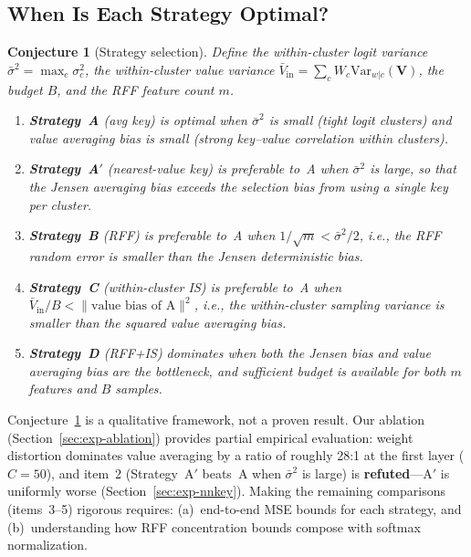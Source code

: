 \documentclass[11pt,a4paper]{article}
\newtheorem{conjecture}[theorem]{Conjecture}
\theoremstyle{definition}
\newcommand{\Var}{\mathrm{Var}}
\begin{document}
\subsection{When Is Each Strategy Optimal?}

\begin{conjecture}[Strategy selection]\label{conj:strategy}
Define the within-cluster logit variance $\bar{\sigma}^2 = \max_c\sigma_c^2$,
the within-cluster value variance
$\bar{V}_{\mathrm{in}} = \sum_c W_c\Var_{w|c}(\mathbf{V})$,
the budget $B$, and the RFF feature count $m$.
\begin{enumerate}[nosep]
  \item \textbf{Strategy~A} (avg key) is optimal when $\bar{\sigma}^2$ is
    small (tight logit clusters) and value averaging bias is small (strong
    key--value correlation within clusters).

  \item \textbf{Strategy~A$'$} (nearest-value key) is preferable to~A when
    $\bar{\sigma}^2$ is large, so that the Jensen averaging bias exceeds the
    selection bias from using a single key per cluster.

  \item \textbf{Strategy~B} (RFF) is preferable to~A when
    $1/\sqrt{m} < \bar{\sigma}^2/2$, i.e., the RFF random error is smaller
    than the Jensen deterministic bias.

  \item \textbf{Strategy~C} (within-cluster IS) is preferable to~A when
    $\bar{V}_{\mathrm{in}}/B < \|\text{value bias of A}\|^2$, i.e., the
    within-cluster sampling variance is smaller than the squared value
    averaging bias.

  \item \textbf{Strategy~D} (RFF+IS) dominates when both the Jensen bias and
    value averaging bias are the bottleneck, and sufficient budget is
    available for both $m$ features and $B$ samples.
\end{enumerate}
\end{conjecture}

\begin{researchnote}
Conjecture~\ref{conj:strategy} is a qualitative framework, not a proven
result.  Our ablation (Section~\ref{sec:exp-ablation}) provides partial
empirical evaluation: weight distortion dominates value averaging by a ratio
of roughly 28:1 at the first layer ($C=50$), and item~2 (Strategy~A$'$ beats~A
when $\bar\sigma^2$ is large) is \textbf{refuted}---A$'$ is uniformly worse
(Section~\ref{sec:exp-nnkey}).
Making the remaining comparisons (items~3--5) rigorous requires:
(a)~end-to-end MSE bounds for each strategy, and (b)~understanding how RFF
concentration bounds compose with softmax normalization.
\end{researchnote}
\end{document}
